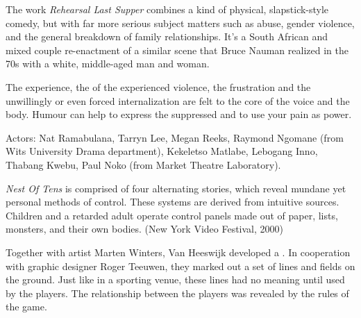 {{


The work {\em Rehearsal Last Supper} combines a kind of  physical, slapstick{}-style comedy, but with far more serious
subject matters such as abuse, gender violence, and the general
breakdown of family relationships. It's a South
African and mixed couple re{}-enactment of a similar scene that Bruce
Nauman realized in the 70s with a white, middle{}-aged man and woman. 

The experience, the  of the experienced violence, the
frustration and the unwillingly or even forced internalization are felt
to the core of the voice and the body. Humour can help to express the
suppressed and to use your pain as power.

Actors: Nat Ramabulana, Tarryn Lee, Megan Reeks, Raymond Ngomane (from
Wits University Drama department), Kekeletso Matlabe, Lebogang Inno,
Thabang Kwebu, Paul Noko (from Market Theatre Laboratory).
\blank
{}



{\em Nest Of Tens} is comprised of four alternating stories, which
reveal mundane yet personal methods of control. These systems are
derived from intuitive sources. Children and a retarded adult operate
control panels made out of paper, lists, monsters, and their own
bodies. 
\blank
{} (New York Video
Festival, 2000)
\blank



Together with artist Marten Winters, Van
Heeswijk developed a . In cooperation with graphic designer
Roger Teeuwen, they marked out a set of lines and fields on the ground.
Just like in a sporting venue, these lines had no meaning until used by
the players. The relationship between the players was revealed by the
rules of the game. 

}}
